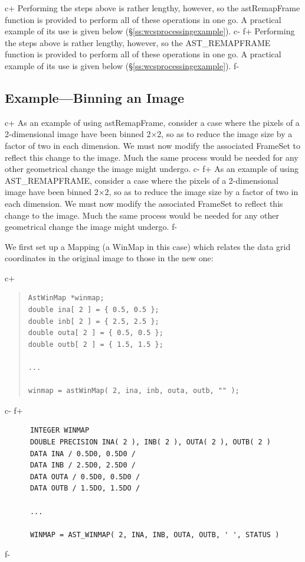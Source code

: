 \documentclass[twoside,11pt]{article}
\newcommand{\secref}[1]{\S\ref{#1}}
\newcommand{\secref}[1]{\ref{#1}}
\begin{document}
c+
Performing the steps above is rather lengthy, however, so the
astRemapFrame function is provided to perform all of these operations
in one go. A practical example of its use is given below
(\secref{ss:wcsprocessingexample}).
c-
f+
Performing the steps above is rather lengthy, however, so the
AST\_REMAPFRAME function is provided to perform all of these
operations in one go.  A practical example of its use is given below
(\secref{ss:wcsprocessingexample}).
f-

\subsection{\label{ss:wcsprocessingexample}Example---Binning an Image}

c+
As an example of using astRemapFrame, consider a case where the pixels
of a 2-dimensional image have been binned 2$\times$2, so as to reduce
the image size by a factor of two in each dimension.  We must now
modify the associated FrameSet to reflect this change to the
image. Much the same process would be needed for any other geometrical
change the image might undergo.
c-
f+
As an example of using AST\_REMAPFRAME, consider a case where the
pixels of a 2-dimensional image have been binned 2$\times$2, so as to
reduce the image size by a factor of two in each dimension.  We must
now modify the associated FrameSet to reflect this change to the
image. Much the same process would be needed for any other geometrical
change the image might undergo.
f-

We first set up a Mapping (a WinMap in this case) which relates the
data grid coordinates in the original image to those in the new one:

c+
\begin{quote}
\small
\begin{verbatim}
AstWinMap *winmap;
double ina[ 2 ] = { 0.5, 0.5 };
double inb[ 2 ] = { 2.5, 2.5 };
double outa[ 2 ] = { 0.5, 0.5 };
double outb[ 2 ] = { 1.5, 1.5 };

...

winmap = astWinMap( 2, ina, inb, outa, outb, "" );
\end{verbatim}
\normalsize
\end{quote}
c-
f+
\small
\begin{verbatim}
      INTEGER WINMAP
      DOUBLE PRECISION INA( 2 ), INB( 2 ), OUTA( 2 ), OUTB( 2 )
      DATA INA / 0.5D0, 0.5D0 /
      DATA INB / 2.5D0, 2.5D0 /
      DATA OUTA / 0.5D0, 0.5D0 /
      DATA OUTB / 1.5DO, 1.5DO /

      ...

      WINMAP = AST_WINMAP( 2, INA, INB, OUTA, OUTB, ' ', STATUS )
\end{verbatim}
\normalsize
f-
\end{document}
